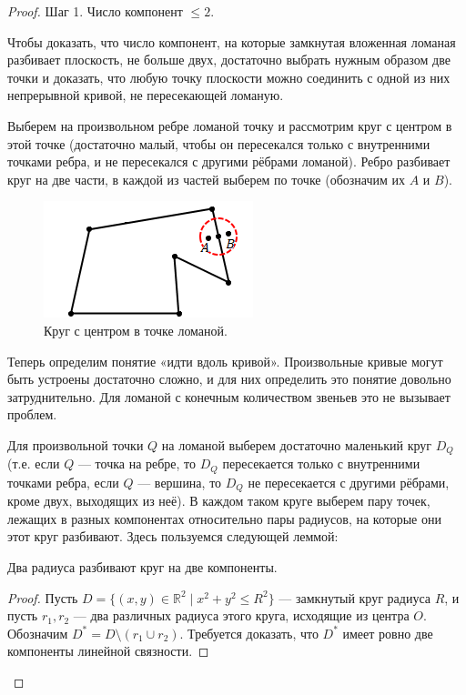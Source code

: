 \begin{proof}
    Шаг 1. Число компонент $\leqslant 2$.

    Чтобы доказать, что число компонент, на которые замкнутая вложенная ломаная разбивает плоскость, не больше двух, достаточно выбрать нужным образом две точки и доказать, что любую точку плоскости можно соединить с одной из них непрерывной кривой, не пересекающей ломаную.

    Выберем на произвольном ребре ломаной точку и рассмотрим круг с центром в этой точке (достаточно малый, чтобы он пересекался только с внутренними точками ребра, и не пересекался с другими рёбрами ломаной). Ребро разбивает круг на две части, в каждой из частей выберем по точке (обозначим их $A$ и $B$).

    \begin{figure}[h]
        \centering
        \includegraphics{images/c4.1.png}
        \caption{Круг с центром в точке ломаной.}
        \label{fig:c4.1}
    \end{figure}

    Теперь определим понятие «идти вдоль кривой». Произвольные кривые могут быть устроены достаточно сложно, и для них определить это понятие довольно затруднительно. Для ломаной с конечным количеством звеньев это не вызывает проблем.

    Для произвольной точки $Q$ на ломаной выберем достаточно маленький круг $D_Q$ (т.е. если $Q$ — точка на ребре, то $D_Q$ пересекается только с внутренними точками ребра, если $Q$ — вершина, то $D_Q$ не пересекается с другими рёбрами, кроме двух, выходящих из неё). В каждом таком круге выберем пару точек, лежащих в разных компонентах относительно пары радиусов, на которые они этот круг разбивают. Здесь пользуемся следующей леммой:

    \begin{lemma}
        Два радиуса разбивают круг на две компоненты.
    \end{lemma}
    \begin{proof}
        Пусть $D = \{ (x,y) \in \mathbb{R}^2 \mid x^2 + y^2 \leq R^2 \}$ — замкнутый круг радиуса $R$, и пусть $r_1, r_2$ — два различных радиуса этого круга, исходящие из центра $O$. Обозначим $D^* = D \setminus (r_1 \cup r_2)$. Требуется доказать, что $D^*$ имеет ровно две компоненты линейной связности.


\end{proof}
\end{proof}
